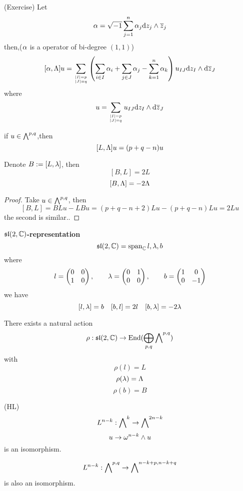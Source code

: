 \begin{cor}(Exercise)
Let
$$
  \alpha=\sqrt{-1}\sum_{j=1}^n
       \alpha_j\mathrm{d} z_j\wedge\overline{z}_j
$$
then,($\alpha$ is a operator of bi-degree $(1,1)$)
$$
  [\alpha,\Lambda]u
=
  \sum_{|I|=p\atop |J|=q}
    \left(
      \sum_{i\in I}
        \alpha_i
     +\sum_{j\in J}
        \alpha_j
     -\sum_{k=1}^n
        \alpha_k
    \right)
    u_{IJ}\mathrm{d} z_I\wedge\mathrm{d}\overline{z}_J
$$
where
$$u=\sum_{|I|=p\atop |J|=q}
u_{IJ}\mathrm{d} z_I\wedge\mathrm{d}\overline{z}_J$$
\end{cor}

\begin{cor}
if $u\in\bigwedge\nolimits^{p,q}$,then
$$[L,\Lambda]u=(p+q-n)u$$
\end{cor}

\begin{cor}
Denote $B:=[L,\lambda]$, then
$$[B,L]=2L$$
$$[B,\Lambda]=-2\Lambda$$
\end{cor}

\begin{proof}
Take $u\in\bigwedge\nolimits^{p,q}$, then
$$[B,L]=BLu-LBu=(p+q-n+2)Lu-(p+q-n)Lu=2Lu$$
the second is similar..
\end{proof}


\textbf{$\mathfrak{sl}(2,\mathbb{C})$-representation}
$$\mathfrak{sl}(2,\mathbb{C})=\operatorname{span}_{\mathbb{C}}{l,\lambda,b}$$
where
$$
  l=\begin{pmatrix}
      0 & 0\\
      1 & 0
    \end{pmatrix}
,\qquad
  \lambda=\begin{pmatrix}
      0 & 1\\
      0 & 0
    \end{pmatrix}
,\qquad
  b=\begin{pmatrix}
      1 & 0\\
      0 & -1
    \end{pmatrix}
$$
we have
$$[l,\lambda]=b\quad
  [b,l]=2l\quad
  [b,\lambda]=-2\lambda
$$

\begin{prop}
There exists a natural action
$$\rho:\mathfrak{sl}(2,\mathbb{C})\to\operatorname{End}(\bigoplus_{p,q}\bigwedge\nolimits^{p,q})$$
with
$$\rho(l)=L$$
$$\rho(\lambda)=\Lambda$$
$$\rho(b)=B$$
\end{prop}

\begin{thm}(HL)
$$L^{n-k}:\bigwedge\nolimits^{k}\to\bigwedge\nolimits^{2n-k}$$
$$u\to\omega^{n-k}\wedge u$$
is an isomorphism.

$$L^{n-k}:\bigwedge\nolimits^{p,q}\to \bigwedge\nolimits^{n-k+p,n-k+q}$$
is also an isomorphism.
\end{thm}

